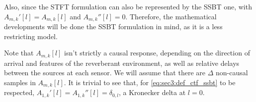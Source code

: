 Also, since the STFT formulation can also be represented by the SSBT one, with $A_{m,k}'[l] = A_{m,k}[l]$ and $A_{m,k}''[l] = 0$. Therefore, the mathematical developments will be done the SSBT formulation in mind, as it is a less restricting model.

Note that $A_{m,k}[l]$ isn't strictly a causal response, depending on the direction of arrival and features of the reverberant environment, as well as relative delays between the sources at each sensor. We will assume that there are $\Delta$ non-causal samples in $A_{m,k}[l]$. It is trivial to see that, for \cref{eq:sec3:def_ctf_ssbt} to be respected, $A_{1,k}'[l] = A_{1,k}''[l] = \delta_{0,l}$, a Kronecker delta at $l=0$.


